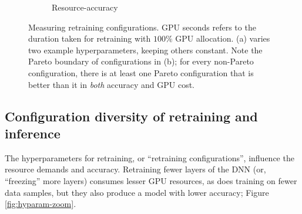 \begin{figure}[t]
\begin{subfigure}[t]{0.48\linewidth}
    \caption{Resource-accuracy}
    \label{fig:darmstadt-profile}
  \end{subfigure}  
  \caption{Measuring retraining configurations. %
  GPU seconds refers to the duration taken for retraining with $100\%$ GPU allocation. (a) varies two example hyperparameters, keeping others constant. Note the Pareto boundary of configurations in (b); for every non-Pareto configuration, there is at least one Pareto configuration that is better than it in {\em both} accuracy and GPU cost. }
  \label{fig:resource-profiles}
\end{figure}


\subsection{Configuration diversity of retraining and inference}
\label{subsec:profiles}

 The hyperparameters for retraining, or ``retraining configurations'', influence the resource demands and accuracy. %
Retraining fewer layers of the DNN (or, ``freezing'' more layers) consumes lesser GPU resources, as does training on fewer data samples, but they also produce a model with lower accuracy; Figure \ref{fig:hyparam-zoom}. %

